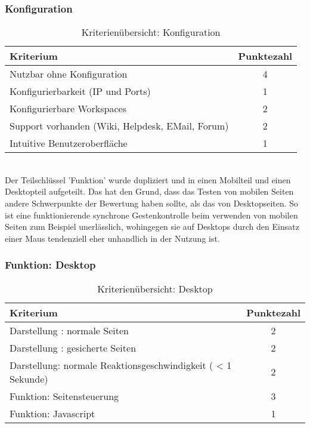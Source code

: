 \subsubsection{Konfiguration}
\begin{table}[H]
 	\vspace{-30pt}
 	\centering
		\begin{tabular}{| p{12cm} | c|}
			\hline
				Kriterium		 &	Punktezahl\\
			\hline
			\hline
				Nutzbar ohne Konfiguration			&4\\
				Konfigurierbarkeit (IP und Ports)			&	1	\\
				Konfigurierbare \Gls{Workspace}s			&	2	\\
				Support vorhanden (Wiki, Helpdesk, EMail, Forum)				&	2	\\
				Intuitive Benutzeroberfläche			&	1	\\
				\hline
		\end{tabular}
	\caption{Kriterienübersicht: Konfiguration}
\end{table}

\\Der Teilschlüssel 'Funktion' wurde dupliziert und in einen Mobilteil und einen Desktopteil aufgeteilt. Das hat den Grund, dass das Testen von mobilen Seiten \mbox{andere} Schwerpunkte der Bewertung haben sollte, als das von \mbox{Desktopseiten}. So ist eine funktionierende synchrone Gestenkontrolle beim verwenden von mobilen Seiten zum Beispiel unerlässlich, wohingegen sie auf Desktops durch den Einsatz einer Maus tendenziell eher unhandlich in der Nutzung ist.
\subsubsection{Funktion: Desktop}
\begin{table}[H]
 	\vspace{-30pt}
 	\centering
		\begin{tabular}{| p{12cm} | c|}
			\hline
				Kriterium		 &	Punktezahl\\
			\hline
			\hline
				Darstellung : normale Seiten			&2\\
				Darstellung : \Gls{gesichert}e Seiten		&	2	\\
				 Darstellung: normale Reaktionsgeschwindigkeit ( < 1 Sekunde)	&	2	\\
				Funktion: Seitensteuerung			&	3	\\
				Funktion: \Gls{Javascript}			&	1	\\
				\hline
		\end{tabular}
	\caption{Kriterienübersicht: Desktop}
\end{table}

